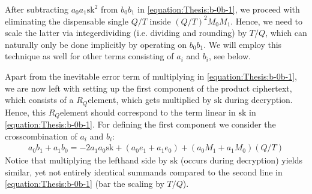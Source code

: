 \documentclass[letterpaper,10pt,english]{jupyterBook}
\begin{document}
\sphinxAtStartPar
After subtracting \(a_0a_1\mathrm{sk}^2\) from \(b_0b_1\) in \eqref{equation:Thesis:b-0b-1}, we proceed with eliminating the dispensable single \(Q/T\) inside \((Q/T)^2 M_0M_1\).
Hence, we need to scale the latter via integer\sphinxhyphen{}dividing (i.e. dividing and rounding) by \(T/Q\), which can naturally only be done implicitly by operating on \(b_0b_1\).
We will employ this technique as well for other terms consisting of \(a_i\) and \(b_i\), see below.

\sphinxAtStartPar
Apart from the inevitable error term of multiplying in \eqref{equation:Thesis:b-0b-1}, we are now left with setting up the first component of the product ciphertext, which consists of a \(R_Q\)\sphinxhyphen{}element, which gets multiplied by \(\mathrm{sk}\) during decryption.
Hence, this \(R_Q\)\sphinxhyphen{}element should correspond to the term linear in \(\mathrm{sk}\) in \eqref{equation:Thesis:b-0b-1}.
For defining the first component we consider the cross\sphinxhyphen{}combination of \(a_i\) and \(b_i\):
\begin{equation*}
\begin{split}a_0b_1 + a_1b_0 = -2a_1a_0\mathrm{sk} + (a_0e_1+a_1e_0) + (a_0M_1+a_1M_0) (Q/T)\end{split}
\end{equation*}
\sphinxAtStartPar
Notice that multiplying the left\sphinxhyphen{}hand side by \(\mathrm{sk}\) (occurs during decryption) yields similar, yet not entirely identical summands compared to the second line in \eqref{equation:Thesis:b-0b-1} (bar the scaling by \(T/Q\)).
\end{document}
